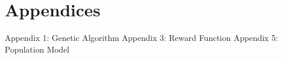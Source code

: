 \documentclass[12pt, a4paper]{article}
\begin{document}
\section*{Appendices}
Appendix 1: Genetic Algorithm
Appendix 3: Reward Function
Appendix 5: Population Model


 
\end{document}
